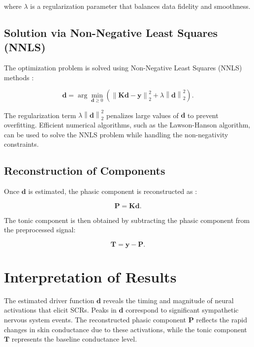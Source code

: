 \documentclass[twocolumn]{article}
\begin{document}
where \( \lambda \) is a regularization parameter that balances data fidelity and smoothness.

\subsection*{Solution via Non-Negative Least Squares (NNLS)}

The optimization problem is solved using Non-Negative Least Squares (NNLS) methods \cite{article}:

\begin{equation}
\mathbf{d} = \arg\min_{\mathbf{d} \geq 0} \left( \left\| \mathbf{K} \mathbf{d} - \mathbf{y} \right\|_2^2 + \lambda \left\| \mathbf{d} \right\|_2^2 \right).
\end{equation}

The regularization term \( \lambda \left\| \mathbf{d} \right\|_2^2 \) penalizes large values of \( \mathbf{d} \) to prevent overfitting. Efficient numerical algorithms, such as the Lawson-Hanson algorithm, can be used to solve the NNLS problem while handling the non-negativity constraints.

\subsection*{Reconstruction of Components}

Once \( \mathbf{d} \) is estimated, the phasic component is reconstructed as \cite{nihDecompositionSkin}:

\begin{equation}
\mathbf{P} = \mathbf{K} \mathbf{d}.
\end{equation}

The tonic component is then obtained by subtracting the phasic component from the preprocessed signal:

\begin{equation}
\mathbf{T} = \mathbf{y} - \mathbf{P}.
\end{equation}

\section*{Interpretation of Results}

The estimated driver function \( \mathbf{d} \) reveals the timing and magnitude of neural activations that elicit SCRs. Peaks in \( \mathbf{d} \) correspond to significant sympathetic nervous system events. The reconstructed phasic component \( \mathbf{P} \) reflects the rapid changes in skin conductance due to these activations, while the tonic component \( \mathbf{T} \) represents the baseline conductance level.
\end{document}
